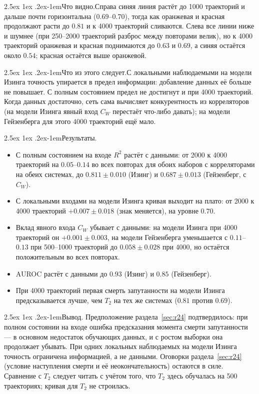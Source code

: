 \documentclass[12pt,a4paper]{report}
\makeatletter
\renewcommand\paragraph{\@startsection{paragraph}{4}{\z@}%
  {2.5ex \@plus1ex \@minus.2ex}{-1em}{\normalfont\normalsize\bfseries}}
\numberwithin{equation}{chapter}
\newcommand{\figsee}{\paragraph{Что видно.}}
\newcommand{\figgen}{\paragraph{Что из этого следует.}}
\makeatother
\begin{document}
\figsee Справа синяя линия растёт до 1000 траекторий и дальше почти
горизонтальна ($0.69$--$0.70$), тогда как оранжевая и красная продолжают
расти до $0.81$ и к 4000 траекторий сливаются. Слева все линии ниже и
шумнее (при 250--2000 траекторий разброс между повторами велик), но к 4000
траекторий оранжевая и красная поднимаются до $0.63$ и $0.69$, а синяя
остаётся около $0.54$; красная остаётся выше оранжевой.

\figgen С локальными наблюдаемыми на модели Изинга точность упирается в
предел информации: добавление данных её больше не повышает. С полным
состоянием предел не достигнут и при 4000 траекторий. Когда данных
достаточно, сеть сама вычисляет конкурентность из корреляторов (на модели
Изинга явный вход $C_W$ перестаёт что-либо давать); на модели Гейзенберга
для этого 4000 траекторий ещё мало.

\paragraph{Результаты.}
\begin{itemize}
\item С полным состоянием на входе $R^2$ растёт с данными: от 2000 к 4000
      траекторий на $0.05$--$0.14$ во всех повторах для обоих наборов с
      корреляторами на обеих системах, до $0.811\pm0.010$ (Изинг) и
      $0.687\pm0.013$ (Гейзенберг, с $C_W$).
\item С локальными входами на модели Изинга кривая выходит на плато: от
      2000 к 4000 траекторий $+0.007\pm0.018$ (знак меняется), на уровне
      $0.70$.
\item Вклад явного входа $C_W$ убывает с данными: на модели Изинга при 4000
      траекторий он $+0.001\pm0.003$, на модели Гейзенберга уменьшается с
      $0.11$--$0.13$ при 500--1000 траекторий до $0.058\pm0.028$ при 4000,
      но остаётся положительным во всех повторах.
\item AUROC растёт с данными до $0.93$ (Изинг) и $0.85$ (Гейзенберг).
\item При 4000 траекторий первая смерть запутанности на модели Изинга
      предсказывается лучше, чем $T_2$ на тех же системах ($0.81$ против
      $0.69$).
\end{itemize}

\paragraph{Вывод.} Предположение раздела~\ref{sec:r24} подтвердилось: при
полном состоянии на входе ошибка предсказания момента смерти запутанности
--- в основном недостаток обучающих данных, и с ростом выборки она
продолжает убывать. При одних локальных наблюдаемых на модели Изинга
точность ограничена информацией, а не данными. Оговорки
раздела~\ref{sec:r24} (условие наступления смерти и её неокончательность)
остаются в силе. Сравнение с $T_2$ следует читать с учётом того, что
$T_2$ здесь обучалась на 500 траекториях; кривая для $T_2$ не строилась.
\end{document}
